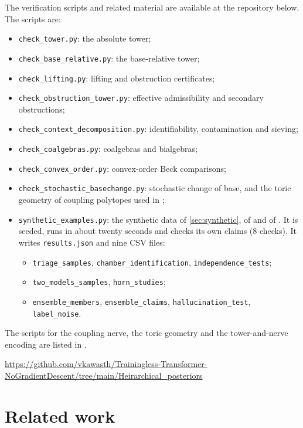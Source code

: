 \documentclass[11pt]{article}
\theoremstyle{definition}
\theoremstyle{remark}
\begin{document}
The verification scripts and related material are available at the repository below. The scripts
are:
\begin{itemize}[leftmargin=*,nosep]
\item \texttt{check\_tower.py}: the absolute tower;
\item \texttt{check\_base\_relative.py}: the base-relative tower;
\item \texttt{check\_lifting.py}: lifting and obstruction certificates;
\item \texttt{check\_obstruction\_tower.py}: effective admissibility and secondary obstructions;
\item \texttt{check\_context\_decomposition.py}: identifiability, contamination and sieving;
\item \texttt{check\_coalgebras.py}: coalgebras and bialgebras;
\item \texttt{check\_convex\_order.py}: convex-order Beck comparisons;
\item \texttt{check\_stochastic\_basechange.py}: stochastic change of base, and the toric geometry of
  coupling polytopes used in \cite{Awasthi-Attribution,Conditionals};
\item \texttt{synthetic\_examples.py}: the synthetic data of \cref{sec:synthetic}, of
  \cite[Section~12]{Conditionals} and of \cite[Section~15]{Awasthi-Family}. It is seeded, runs in about twenty
  seconds and checks its own claims (8 checks). It writes \texttt{results.json} and nine CSV files:
  \begin{itemize}[nosep]
  \item \texttt{triage\_samples}, \texttt{chamber\_identification}, \texttt{independence\_tests};
  \item \texttt{two\_models\_samples}, \texttt{horn\_studies};
  \item \texttt{ensemble\_members}, \texttt{ensemble\_claims}, \texttt{hallucination\_test}, \texttt{label\_noise}.
  \end{itemize}
\end{itemize}
The scripts for the coupling nerve, the toric geometry and the tower-and-nerve encoding are listed in
\cite[Section~14]{Conditionals}.
\begin{center}\small\url{https://github.com/vkawasth/Trainingless-Transformer-NoGradientDescent/tree/main/Heirarchical_posteriors}\end{center}

\section{Related work}
\end{document}
